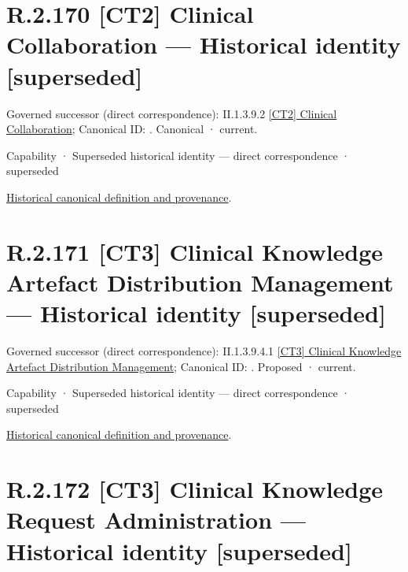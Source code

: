 \section*{R.2.170 [CT2] Clinical Collaboration — Historical identity [superseded]}
\label{navigation:R.2.170}

{\small Governed successor (direct correspondence): II.1.3.9.2 \hyperref[element:e6429225463a44d39f82e490e254e5d4]{[CT2] Clinical Collaboration}; Canonical ID: \texttt{}. Canonical · current.}\par
\label{element:c5adc1955b6046d8b920b0176cebc9de}
{\small Capability · Superseded historical identity — direct correspondence · superseded}\par
\href{../../../../continuum/strategy/capability/c5adc1955b6046d8b920b0176cebc9de.md}{Historical canonical definition and provenance}.\par
\section*{R.2.171 [CT3] Clinical Knowledge Artefact Distribution Management — Historical identity [superseded]}
\label{navigation:R.2.171}

{\small Governed successor (direct correspondence): II.1.3.9.4.1 \hyperref[element:cd29a9eb798949bc8bc81bb5d434cabf]{[CT3] Clinical Knowledge Artefact Distribution Management}; Canonical ID: \texttt{}. Proposed · current.}\par
\label{element:d81e0d6d76014066a682e3d9e03e5f8a}
{\small Capability · Superseded historical identity — direct correspondence · superseded}\par
\href{../../../../continuum/strategy/capability/d81e0d6d76014066a682e3d9e03e5f8a.md}{Historical canonical definition and provenance}.\par
\section*{R.2.172 [CT3] Clinical Knowledge Request Administration — Historical identity [superseded]}
\label{navigation:R.2.172}

